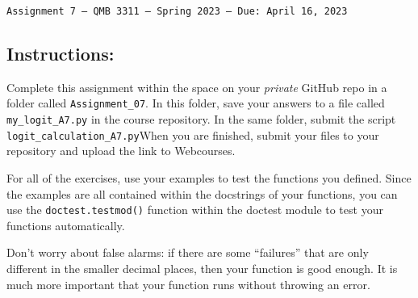 \documentclass[11pt]{exam}
\begin{document}
\texttt{Assignment 7 --- QMB 3311 ---  Spring 2023  --- Due: April 16, 2023}

\subsection*{Instructions:}

Complete this assignment within the space on your \textit{private} GitHub repo in a folder called \texttt{Assignment\_07}. In this folder, save your answers to a file called \texttt{my\_logit\_A7.py} in the course repository. In the same folder, submit the script \texttt{logit\_calculation\_A7.py}When you are finished, submit your files to your repository and upload the link to Webcourses.

For all of the exercises, use your examples to test the functions you defined. Since the examples are all contained within the docstrings of your functions, you can use the
\texttt{doctest.testmod()} function within the doctest module to test your functions automatically.

Don't worry about false alarms: if there are some ``failures'' that are only different in the smaller decimal places, then your function is good enough. It is much more important that your function runs without throwing an error.
\end{document}
